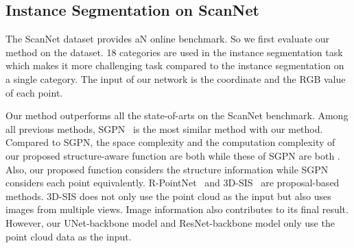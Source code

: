 \documentclass{article}
\begin{document}
\begin{table}[t]
	
	\caption{Comparison of different network structures.}
	\label{ablation_study}
	
	\begin{center}
	\end{center}
	
\end{table}

\subsection{Instance Segmentation on ScanNet}
The ScanNet dataset provides aN online benchmark. So we first evaluate our method on the dataset. 18 categories are used in the instance segmentation task which makes it more challenging task compared to the instance segmentation on a single category. The input of our network is the coordinate and the RGB value of each point.

Our method outperforms all the state-of-arts on the ScanNet benchmark. Among all previous methods, SGPN~\cite{wang2018sgpn} is the most similar method with our method. Compared to SGPN, the space complexity and the computation complexity of our proposed structure-aware function are both  while these of SGPN are both . Also, our proposed function considers the structure information while SGPN considers each point equivalently. R-PointNet~\cite{yi2018gspn} and 3D-SIS~\cite{hou20183d} are proposal-based methods. 3D-SIS does not only use the point cloud as the input but also uses images from multiple views. Image information also contributes to its final result. However, our UNet-backbone model and ResNet-backbone model only use the point cloud data as the input.
\end{document}
